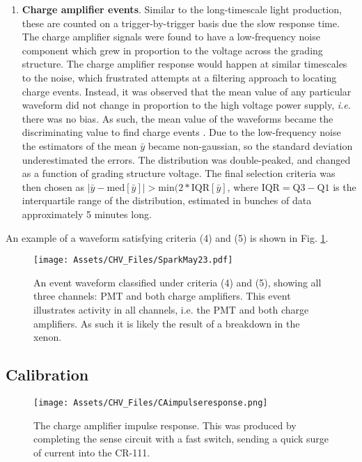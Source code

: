 \begin{enumerate}
    \item 
    \textbf{Charge amplifier events}.
    Similar to the long-timescale light production, these are counted on a trigger-by-trigger basis due the slow response time.
    The charge amplifier signals were found to have a low-frequency noise component which grew in proportion to the voltage across the grading structure.
    The charge amplifier response would happen at similar timescales to the noise, which frustrated attempts at a filtering approach to locating  charge events.
    Instead, it was observed that the mean value of any particular waveform did not change in proportion to the high voltage power supply, \textit{i.e}. there was no bias.
    As such, the mean value of the waveforms became the discriminating value to find charge events
    .
    Due to the low-frequency noise  the estimators of the mean $\bar{y}$ became non-gaussian, so the standard deviation underestimated the errors.
    The distribution was double-peaked, and changed as a function of grading structure voltage.
    The final selection criteria was then chosen as $|\bar{y} - \mathrm{med}[\bar{y}]| > \mathrm{min}(2*\mathrm{IQR}[\bar{y}] $, where $\mathrm{IQR} = \mathrm{Q}3 -\mathrm{Q}1$ is the interquartile range of the distribution, estimated in bunches of data approximately 5 minutes long.
    
\end{enumerate}
  An example of a waveform satisfying criteria (4) and (5) is shown in Fig. \ref{fig:spark}.

\begin{figure}
    \centering
    \texttt{[image: Assets/CHV\_Files/SparkMay23.pdf]}
    \caption[An event waveform classified under criteria (4) and (5), showing all three channels: PMT and both charge amplifiers.]%
    {An event waveform classified under criteria (4) and (5), showing all three channels: PMT and both charge amplifiers.
    This event illustrates activity in all channels, i.e. the PMT and both charge amplifiers.
    As such it is likely the result of a breakdown in the xenon.}
    \label{fig:spark}
\end{figure}

\subsection{Calibration}
\begin{figure}
\centering
\texttt{[image: Assets/CHV\_Files/CAimpulseresponse.png]}
\label{fig:charge_amplifier_impulse}
\caption[The CHV purity monitor charge amplifier impulse response.]%
{The charge amplifier impulse response.
This was produced by completing the sense circuit with a fast switch, sending a quick surge of current into the CR-111.}
\end{figure}

